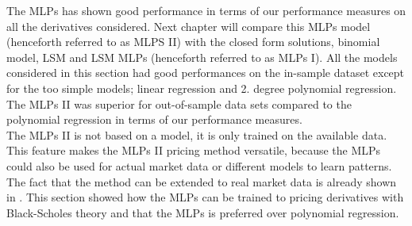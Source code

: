 The MLPs has shown good performance in terms of our performance measures on all the derivatives considered. Next chapter will compare this MLPs model (henceforth referred to as MLPS II) with the closed form solutions, binomial model, LSM and LSM MLPs (henceforth referred to as MLPs I). All the models considered in this section had good performances on the in-sample dataset except for the too simple models; linear regression and 2. degree polynomial regression. The MLPs II was superior for out-of-sample data sets compared to the polynomial regression in terms of our performance measures.\\

The MLPs II is not based on a model, it is only trained on the available data. This feature makes the MLPs II pricing method versatile, because the MLPs could also be used for actual market data or different models to learn patterns. The fact that the method can be extended to real market data is already shown in \parencite{GasparRaquel20}. This section showed how the MLPs can be trained to pricing derivatives with Black-Scholes theory and that the MLPs is preferred over polynomial regression.









